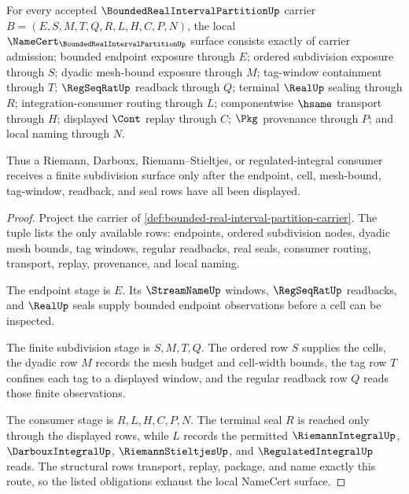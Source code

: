 \begin{theorem}
\label{thm:bounded-real-interval-partition-namecert-obligations}
For every accepted $\BoundedRealIntervalPartitionUp$ carrier $B=(E,S,M,T,Q,R,L,H,C,P,N)$, the local $\NameCert_{\BoundedRealIntervalPartitionUp}$ surface consists exactly of carrier admission; bounded endpoint exposure through $E$; ordered subdivision exposure through $S$; dyadic mesh-bound exposure through $M$; tag-window containment through $T$; $\RegSeqRatUp$ readback through $Q$; terminal $\RealUp$ sealing through $R$; integration-consumer routing through $L$; componentwise $\hsame$ transport through $H$; displayed $\Cont$ replay through $C$; $\Pkg$ provenance through $P$; and local naming through $N$.

Thus a Riemann, Darboux, Riemann--Stieltjes, or regulated-integral consumer receives a finite subdivision surface only after the endpoint, cell, mesh-bound, tag-window, readback, and seal rows have all been displayed.
\end{theorem}
\begin{proof}
Project the carrier of \autoref{def:bounded-real-interval-partition-carrier}. The tuple lists the only available rows: endpoints, ordered subdivision nodes, dyadic mesh bounds, tag windows, regular readbacks, real seals, consumer routing, transport, replay, provenance, and local naming.

The endpoint stage is $E$. Its $\StreamNameUp$ windows, $\RegSeqRatUp$ readbacks, and $\RealUp$ seals supply bounded endpoint observations before a cell can be inspected.

The finite subdivision stage is $S,M,T,Q$. The ordered row $S$ supplies the cells, the dyadic row $M$ records the mesh budget and cell-width bounds, the tag row $T$ confines each tag to a displayed window, and the regular readback row $Q$ reads those finite observations.

The consumer stage is $R,L,H,C,P,N$. The terminal seal $R$ is reached only through the displayed rows, while $L$ records the permitted $\RiemannIntegralUp$, $\DarbouxIntegralUp$, $\RiemannStieltjesUp$, and $\RegulatedIntegralUp$ reads. The structural rows transport, replay, package, and name exactly this route, so the listed obligations exhaust the local NameCert surface.
\end{proof}

